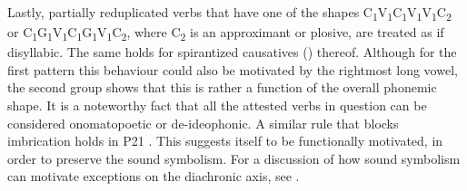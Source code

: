Lastly, partially reduplicated verbs that have one of the shapes \mbox{C\textsubscript{1}V\textsubscript{1}C\textsubscript{1}V\textsubscript{1}V\textsubscript{1}C\textsubscript{2}} or \mbox{C\textsubscript{1}G\textsubscript{1}V\textsubscript{1}C\textsubscript{1}G\textsubscript{1}V\textsubscript{1}C\textsubscript{2}}, where C\textsubscript{2} is an approximant or plosive, are treated as if disyllabic. The same holds for spirantized causatives () thereof. Although for the first pattern this behaviour could also be motivated by the rightmost long vowel, the second group shows that this is rather a function of the overall phonemic shape. It is a noteworthy fact that all the attested verbs in question can be considered onomatopoetic or de-ideophonic. A similar rule that blocks imbrication holds in  P21 \citep[112, 120]{BergerP1938}. This suggests itself to be functionally motivated, in order to preserve the sound symbolism. For a discussion of how sound symbolism can motivate exceptions on the diachronic axis, see \citet[55f]{DimmendaalG2011}.
